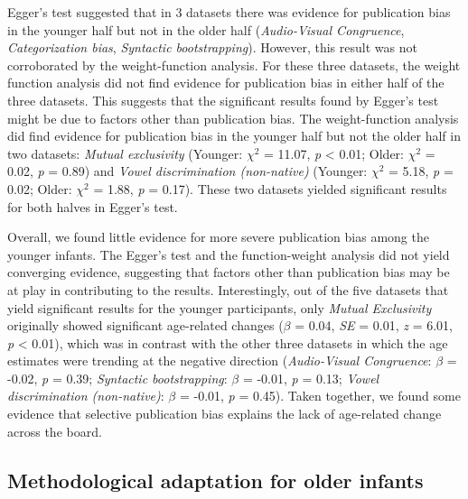 \documentclass[
  man]{apa6}
\begin{document}
Egger's test suggested that in 3 datasets there was evidence for publication bias in the younger half but not in the older half (\emph{Audio-Visual Congruence}, \emph{Categorization bias}, \emph{Syntactic bootstrapping}). However, this result was not corroborated by the weight-function analysis. For these three datasets, the weight function analysis did not find evidence for publication bias in either half of the three datasets. This suggests that the significant results found by Egger's test might be due to factors other than publication bias. The weight-function analysis did find evidence for publication bias in the younger half but not the older half in two datasets: \emph{Mutual exclusivity} (Younger: \(\chi^2\) = 11.07, \emph{p} \textless{} 0.01; Older: \(\chi^2\) = 0.02, \emph{p} = 0.89) and \emph{Vowel discrimination (non-native)} (Younger: \(\chi^2\) = 5.18, \emph{p} = 0.02; Older: \(\chi^2\) = 1.88, \emph{p} = 0.17). These two datasets yielded significant results for both halves in Egger's test.

Overall, we found little evidence for more severe publication bias among the younger infants. The Egger's test and the function-weight analysis did not yield converging evidence, suggesting that factors other than publication bias may be at play in contributing to the results. Interestingly, out of the five datasets that yield significant results for the younger participants, only \emph{Mutual Exclusivity} originally showed significant age-related changes (\(\beta\) = 0.04, \emph{SE} = 0.01, \emph{z} = 6.01, \emph{p} \textless{} 0.01), which was in contrast with the other three datasets in which the age estimates were trending at the negative direction (\emph{Audio-Visual Congruence}: \(\beta\) = -0.02, \emph{p} = 0.39; \emph{Syntactic bootstrapping}: \(\beta\) = -0.01, \emph{p} = 0.13; \emph{Vowel discrimination (non-native)}: \(\beta\) = -0.01, \emph{p} = 0.45). Taken together, we found some evidence that selective publication bias explains the lack of age-related change across the board.

\hypertarget{methodological-adaptation-for-older-infants}{%
\subsection{Methodological adaptation for older infants}\label{methodological-adaptation-for-older-infants}}
\end{document}

